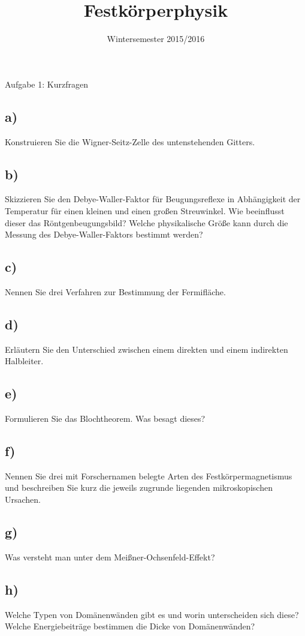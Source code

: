 

\subject{FKP}
\title{Festkörperphysik}
\date{
    Wintersemester 2015/2016
}



\maketitle
\thispagestyle{empty}
\newpage


\begin{aufgabe}{Aufgabe 1: Kurzfragen}
    \subsection{a)}
    Konstruieren Sie die Wigner-Seitz-Zelle des untenstehenden Gitters.
    \subsection{b)}
    Skizzieren Sie den Debye-Waller-Faktor für Beugungsreflexe in Abhängigkeit der Temperatur für einen kleinen und einen großen Streuwinkel.
    Wie beeinflusst dieser das Röntgenbeugungsbild? %
    Welche physikalische Größe kann durch die Messung des Debye-Waller-Faktors bestimmt werden?
    \subsection{c)}
    Nennen Sie drei Verfahren zur Bestimmung der Fermifläche.
    \subsection{d)}
    Erläutern Sie den Unterschied zwischen einem direkten und einem indirekten Halbleiter.
    \subsection{e)}
    Formulieren Sie das Blochtheorem.
    Was besagt dieses?
    \subsection{f)}
    Nennen Sie drei mit Forschernamen belegte Arten des Festkörpermagnetismus und beschreiben Sie kurz die jeweils zugrunde liegenden mikroskopischen Ursachen.
    \subsection{g)}
    Was versteht man unter dem Meißner-Ochsenfeld-Effekt?
    \subsection{h)}
    Welche Typen von Domänenwänden gibt es und worin unterscheiden sich diese?
    Welche Energiebeiträge bestimmen die Dicke von Domänenwänden?
\end{aufgabe}

